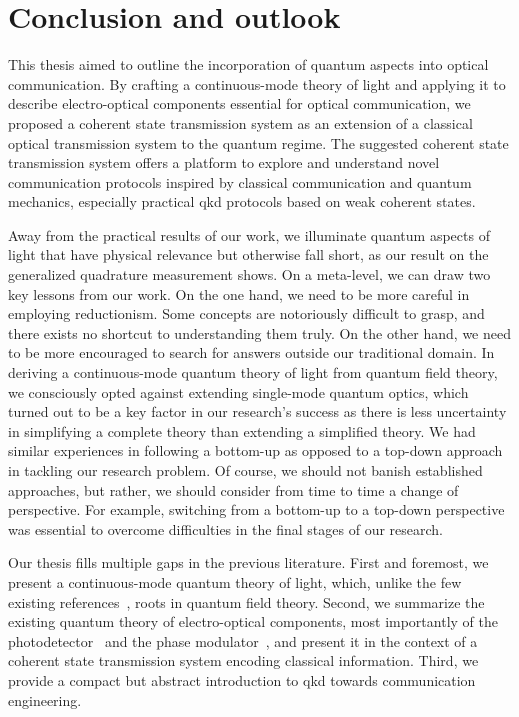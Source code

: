 \chapter*{Conclusion and outlook}

This thesis aimed to outline the incorporation of quantum aspects into optical communication.
By crafting a continuous-mode theory of light and applying it to describe electro-optical components essential for optical communication, we proposed a coherent state transmission system as an extension of a classical optical transmission system to the quantum regime.
The suggested coherent state transmission system offers a platform to explore and understand novel communication protocols inspired by classical communication and quantum mechanics, especially practical \gls{qkd} protocols based on weak coherent states.

Away from the practical results of our work, we illuminate quantum aspects of light that have physical relevance but otherwise fall short, as our result on the generalized quadrature measurement shows.
On a meta-level, we can draw two key lessons from our work.
On the one hand, we need to be more careful in employing reductionism.
Some concepts are notoriously difficult to grasp, and there exists no shortcut to understanding them truly.
On the other hand, we need to be more encouraged to search for answers outside our traditional domain.
In deriving a continuous-mode quantum theory of light from quantum field theory, we consciously opted against extending single-mode quantum optics, which turned out to be a key factor in our research's success as there is less uncertainty in simplifying a complete theory than extending a simplified theory.
We had similar experiences in following a bottom-up as opposed to a top-down approach in tackling our research problem.
Of course, we should not banish established approaches, but rather, we should consider from time to time a change of perspective.
For example, switching from a bottom-up to a top-down perspective was essential to overcome difficulties in the final stages of our research.

Our thesis fills multiple gaps in the previous literature.
First and foremost, we present a continuous-mode quantum theory of light, which, unlike the few existing references~\cite{Barnett2002,Loudon2000}, roots in quantum field theory.
Second, we summarize the existing quantum theory of electro-optical components, most importantly of the photodetector~\cite{Vogel2006,Mandel1995,Shapiro2009} and the phase modulator~\cite{Horoshko2018}, and present it in the context of a coherent state transmission system encoding classical information.
Third, we provide a compact but abstract introduction to \gls{qkd} towards communication engineering.

